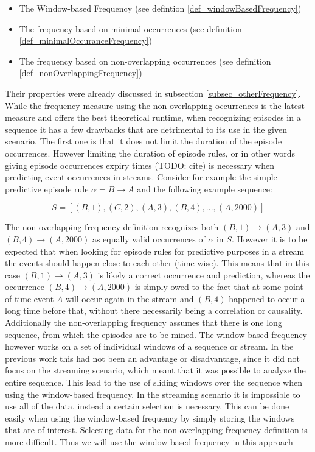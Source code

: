 \begin{itemize}
	\item The Window-based Frequency (see defintion \ref{def_windowBasedFrequency})
	\item The frequency based on minimal occurrences (see definition \ref{def_minimalOccuranceFrequency})
	\item The frequency based on non-overlapping occurrences (see definition \ref{def_nonOverlappingFrequency})
\end{itemize}

Their properties were already discussed in subsection \ref{subsec_otherFrequency}. While the frequency measure using the non-overlapping occurrences is the latest measure and offers the best theoretical runtime, when recognizing episodes in a sequence it has a few drawbacks that are detrimental to its use in the given scenario. The first one is that it does not limit the duration of the episode occurrences. However limiting the duration of episode rules, or in other words giving episode occurrences expiry times (TODO: cite) is necessary when predicting event occurrences in streams. Consider for example the simple predictive episode rule $\alpha = B \rightarrow A$ and the following example sequence: 

\begin{equation}
S = [ (B,1),(C,2),(A,3),(B,4),...,(A,2000) ] 
\end{equation}

The non-overlapping frequency definition recognizes both $(B,1) \rightarrow (A,3)$ and $(B,4) \rightarrow (A,2000)$ as equally valid occurrences of $\alpha$ in $S$. However it is to be expected that when looking for episode rules for predictive purposes in a stream the events should happen close to each other (time-wise). This means that in this case $(B,1) \rightarrow (A,3)$ is likely a correct occurrence and prediction, whereas the occurrence $(B,4) \rightarrow (A,2000)$ is simply owed to the fact that at some point of time event $A$ will occur again in the stream and $(B,4)$ happened to occur a long time before that, without there necessarily being a correlation or causality.
Additionally the non-overlapping frequency assumes that there is one long sequence, from which the episodes are to be mined. The window-based frequency however works on a set of individual windows of a sequence or stream. In the previous work this had not been an advantage or disadvantage, since it did not focus on the streaming scenario, which meant that it was possible to analyze the entire sequence. This lead to the use of sliding windows over the sequence when using the window-based frequency. In the streaming scenario it is impossible to use all of the data, instead a certain selection is necessary. This can be done easily when using the window-based frequency by simply storing the windows that are of interest. Selecting data for the non-overlapping frequency definition is more difficult. Thus we will use the window-based frequency in this approach

